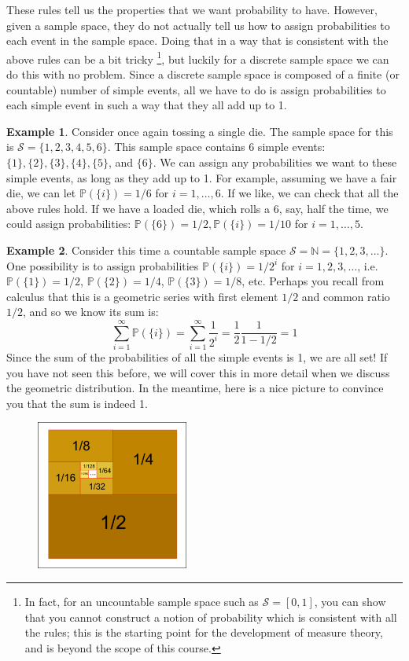 \documentclass[12pt]{article}
\theoremstyle{definition}
\newtheorem*{example}{Example}
\theoremstyle{remark}
\def\N{{\mathbb N}}
\def\P{{\mathbb P}}
\def\cals{{\mathcal S}}
\begin{document}
These rules tell us the properties that we want probability to have. However, given a sample space, they do not actually tell us how to assign probabilities to each event in the sample space. Doing that in a way that is consistent with the above rules can be a bit tricky \footnote{In fact, for an uncountable sample space such as $\cals = [0, 1]$, you can show that you cannot construct a notion of probability which is consistent with all the rules; this is the starting point for the development of measure theory, and is beyond the scope of this course.}, but luckily for a discrete sample space we can do this with no problem. Since a discrete sample space is composed of a finite (or countable) number of simple events, all we have to do is assign probabilities to each simple event in such a way that they all add up to 1.

\begin{example}Consider once again tossing a single die. The sample space for this is $\cals = \{1, 2, 3, 4, 5, 6\}$. This sample space contains 6 simple events: $\{1\}, \{2\}, \{3\},\{4\}, \{5\}$, and $\{6\}$. We can assign any probabilities we want to these simple events, as long as they add up to 1. For example, assuming we have a fair die, we can let $\P(\{i\}) = 1/6$ for $i = 1, \dots, 6$. If we like, we can check that all the above rules hold. If we have a loaded die, which rolls a 6, say, half the time, we could assign probabilities: $\P(\{6\}) = 1/2, \P(\{i\}) = 1/10$ for $i = 1, \dots, 5$.
\end{example}

\begin{example}Consider this time a countable sample space $\cals = \N = \{1, 2, 3, \dots\}$. One possibility is to assign probabilities $\P(\{i\}) = 1/2^i$ for $i = 1, 2, 3, \dots$, i.e. $\P(\{1\}) = 1/2$, $\P(\{2\}) = 1/4$, $\P(\{3\}) = 1/8$, etc. Perhaps you recall from calculus that this is a geometric series with first element $1/2$ and common ratio $1/2$, and so we know its sum is:
\[
\sum_{i = 1}^{\infty} \P(\{i\}) = \sum_{i = 1}^{\infty} \frac{1}{2^i} = \frac{1}{2}\frac{1}{1 - 1/2} = 1
\]
Since the sum of the probabilities of all the simple events is 1, we are all set! If you have not seen this before, we will cover this in more detail when we discuss the geometric distribution. In the meantime, here is a nice picture to convince you that the sum is indeed 1.
\begin{figure}[H]
\centering
\includegraphics[width=5cm]{Geometric_series}
\end{figure}
\end{example}
\end{document}
